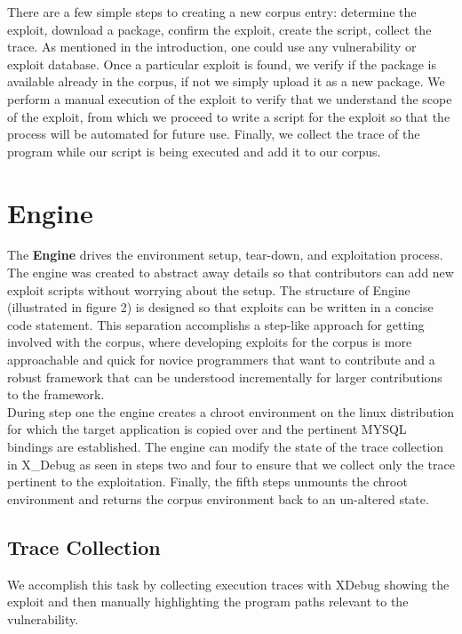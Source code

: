 \documentclass[letterpaper,twocolumn,10pt]{article}
\begin{document}
There are a few simple steps to creating a new corpus entry: determine the exploit, download a package, confirm the exploit, create the script, collect the trace.  As mentioned in the introduction, one could use any vulnerability or exploit database.   Once a particular exploit is found, we verify if the package is available already in the corpus, if not we simply upload it as a new package.  We perform a manual execution of the exploit to verify that we understand the scope of the exploit, from which we proceed to write a script for the exploit so that the process will be automated for future use.  Finally, we collect the trace of the program while our script is being executed and add it to our corpus.


\section{Engine}
The {\bf Engine} drives the environment setup, tear-down, and exploitation process.  The engine was created to abstract away details so that contributors can add new exploit scripts without worrying about the setup. The structure of Engine (illustrated in figure 2) is designed so that exploits can be written in a concise code statement.  This separation accomplishs a step-like approach for getting involved with the corpus, where developing exploits for the corpus is more approachable and quick for novice programmers that want to contribute and a robust framework that can be understood incrementally for larger contributions to the framework.  \\

During step one the engine creates a chroot environment on the linux distribution for which the target application is copied over and the pertinent MYSQL bindings are established.  The engine can modify the state of the trace collection in X\_Debug as seen in steps two and four to ensure that we collect only the trace pertinent to the exploitation.  Finally, the fifth steps unmounts the chroot environment and returns the corpus environment back to an un-altered state.


\subsection{Trace Collection}


We accomplish this task by collecting execution traces with XDebug showing the exploit and then manually highlighting the program paths relevant to the vulnerability.
\end{document}
